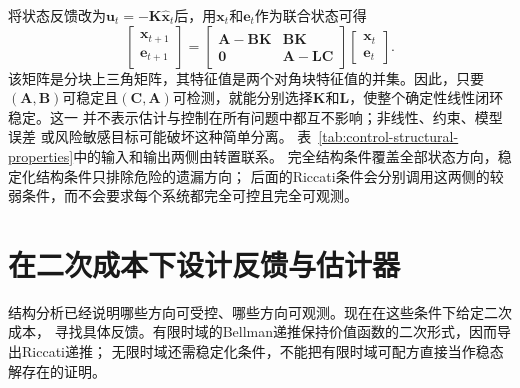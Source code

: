 将状态反馈改为$\bm{u}_t=-\bm{K}\widehat{\bm{x}}_t$后，用$\bm{x}_t$和$\bm{e}_t$作为联合状态可得
\begin{equation}
  \begin{bmatrix}
    \bm{x}_{t+1}\\
    \bm{e}_{t+1}
  \end{bmatrix}
  =
  \begin{bmatrix}
    \bm{A}-\bm{B}\bm{K}&\bm{B}\bm{K}\\
    \bm{0}&\bm{A}-\bm{L}\bm{C}
  \end{bmatrix}
  \begin{bmatrix}
    \bm{x}_t\\
    \bm{e}_t
  \end{bmatrix}.
  \label{eq:control-separation-block}
\end{equation}
该矩阵是分块上三角矩阵，其特征值是两个对角块特征值的并集。因此，只要$(\bm{A},\bm{B})$可稳定且$(\bm{C},\bm{A})$可检测，就能分别选择$\bm{K}$和$\bm{L}$，使整个确定性线性闭环稳定。这一
并不表示估计与控制在所有问题中都互不影响；非线性、约束、模型误差
或风险敏感目标可能破坏这种简单分离。
表~\ref{tab:control-structural-properties}中的输入和输出两侧由转置联系。
完全结构条件覆盖全部状态方向，稳定化结构条件只排除危险的遗漏方向；
后面的Riccati条件会分别调用这两侧的较弱条件，而不会要求每个系统都完全可控且完全可观测。

\section{在二次成本下设计反馈与估计器}
\label{sec:control-lqr-riccati}

结构分析已经说明哪些方向可受控、哪些方向可观测。现在在这些条件下给定二次成本，
寻找具体反馈。有限时域的Bellman递推保持价值函数的二次形式，因而导出Riccati递推；
无限时域还需稳定化条件，不能把有限时域可配方直接当作稳态解存在的证明。
